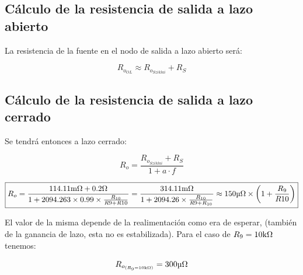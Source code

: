 \subsection{Cálculo de la resistencia de salida a lazo abierto}


La resistencia de la fuente en el nodo de salida a lazo abierto será:

\begin{equation}
R_{o_{OL}} \approx R_{o_{Sziklai}} + R_{S}
\end{equation}


\subsection{Cálculo de la resistencia de salida a lazo cerrado}


Se tendrá entonces a lazo cerrado:

\begin{equation}
R_{o} =  \frac{R_{o_{Sziklai}} + R_{S}}{1 + a \cdot f} 
\end{equation}


\begin{equation}
\boxed{R_{o} = \frac{114.11 \si[per-mode=symbol]{\milli\ohm} + 0.2 \si[per-mode=symbol]{\ohm}}{1 + 2094.263 \times 0.99 \times \frac{R_{10}}{R{9} + R{10}}} = \frac{314.11 \si[per-mode=symbol]{\milli\ohm}}{1 + 2094.26 \times \frac{R_{10}}{R{9} + R_{10}}} \approx 150 \si[per-mode=symbol]{\micro\ohm} \times \left(  1 + \frac{R_{9}}{R{10}} \right) }
\end{equation}

El valor de la misma depende de la realimentación como era de esperar, (también de la ganancia de lazo, esta no es estabilizada). Para el caso de $R_{9} = 10 \si[per-mode=symbol]{\kilo\ohm}$ tenemos:

\begin{equation*}
R_{o_{\left( R_{9} = 10 \si[per-mode=symbol]{\kilo\ohm} \right)}} = 300 \si[per-mode=symbol]{\micro\ohm}
\end{equation*}






